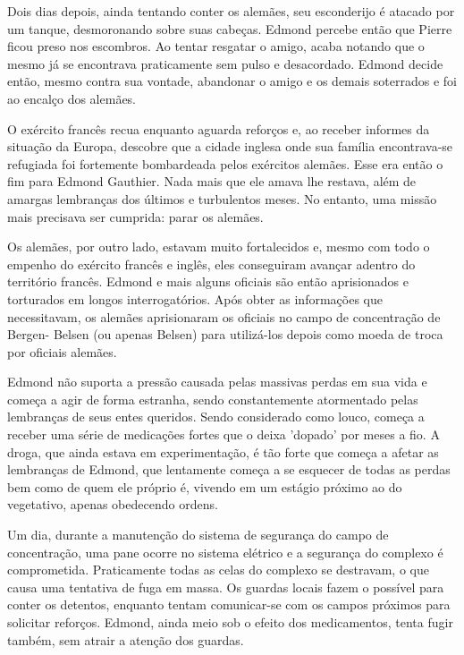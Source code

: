 \documentclass{article}
\begin{document}
    Dois dias depois, ainda tentando conter os alemães, seu esconderijo é atacado por um tanque, desmoronando sobre suas cabeças. Edmond percebe então que Pierre ficou preso nos escombros. Ao tentar resgatar o amigo, acaba notando que o mesmo já se encontrava praticamente sem pulso e desacordado. Edmond decide então, mesmo contra sua vontade, abandonar o amigo e os demais soterrados e foi ao encalço dos alemães.
    
    O exército francês recua enquanto aguarda reforços e, ao receber informes da situação da Europa, descobre que a cidade inglesa onde sua família encontrava-se refugiada foi fortemente bombardeada pelos exércitos alemães. Esse era então o fim para Edmond Gauthier. Nada mais que ele amava lhe restava, além de amargas lembranças dos últimos e turbulentos meses. No entanto, uma missão mais precisava ser cumprida: parar os alemães.
    
    Os alemães, por outro lado, estavam muito fortalecidos e, mesmo com todo o empenho do exército francês e inglês, eles conseguiram avançar adentro do território francês. Edmond e mais alguns oficiais são então aprisionados e torturados em longos interrogatórios. Após obter as informações que necessitavam, os alemães aprisionaram os oficiais no campo de concentração de Bergen- Belsen (ou apenas Belsen) para utilizá-los depois como moeda de troca por oficiais alemães.
    
    Edmond não suporta a pressão causada pelas massivas perdas em sua vida e começa a agir de forma estranha, sendo constantemente atormentado pelas lembranças de seus entes queridos. Sendo considerado como louco, começa a receber uma série de medicações fortes que o deixa 'dopado' por meses a fio. A droga, que ainda estava em experimentação,  é tão forte que começa a afetar as lembranças de Edmond, que lentamente começa a se esquecer de todas as perdas bem como de quem ele próprio é, vivendo em um estágio próximo ao do vegetativo, apenas obedecendo ordens.
    
    Um dia, durante a manutenção do sistema de segurança do campo de concentração, uma pane ocorre no sistema elétrico e a segurança do complexo é comprometida. Praticamente todas as celas do complexo se destravam, o que causa uma tentativa de fuga em massa. Os guardas locais fazem o possível para conter os detentos, enquanto tentam comunicar-se com os campos próximos para solicitar reforços. Edmond, ainda meio sob o efeito dos medicamentos, tenta fugir também, sem atrair a atenção dos guardas. 
    
\end{document}
